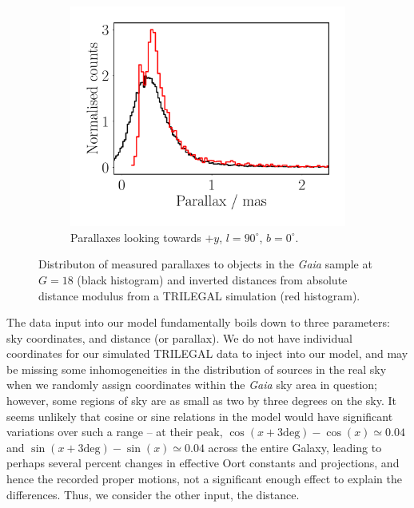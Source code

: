 \documentclass[fleqn,usenatbib]{mnras}
\begin{document}
\begin{figure}
\begin{subfigure}[b]{0.3\textwidth}
        \label{fig:l180dist}
    \end{subfigure}
    \begin{subfigure}[b]{0.3\textwidth}
        \centering
        \includegraphics[width=\textwidth]{Plots/plot_dist_gaia_90_0_18.pdf}
        \caption{Parallaxes looking towards $+y$, $l = 90^\circ$, $b = 0^\circ$.}
        \label{fig:l90dist}
    \end{subfigure}
    \caption{Distributon of measured parallaxes to objects in the \textit{Gaia} sample at $G = 18$ (black histogram) and inverted distances from absolute distance modulus from a TRILEGAL simulation (red histogram).}
    \label{fig:goodishdists}
\end{figure}

The data input into our model fundamentally boils down to three parameters: sky coordinates, and distance (or parallax). We do not have individual coordinates for our simulated TRILEGAL data to inject into our model, and may be missing some inhomogeneities in the distribution of sources in the real sky when we randomly assign coordinates within the \textit{Gaia} sky area in question; however, some regions of sky are as small as two by three degrees on the sky. It seems unlikely that cosine or sine relations in the model would have significant variations over such a range -- at their peak, $\cos(x + 3 \mathrm{deg}) - \cos(x) \simeq 0.04$ and $\sin(x + 3 \mathrm{deg}) - \sin(x) \simeq 0.04$ across the entire Galaxy, leading to perhaps several percent changes in effective Oort constants and projections, and hence the recorded proper motions, not a significant enough effect to explain the differences. Thus, we consider the other input, the distance.
\end{document}
